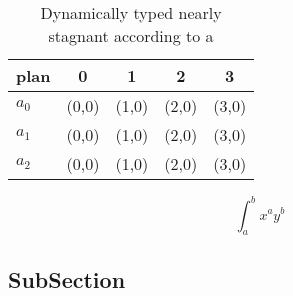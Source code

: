 \documentclass[a4paper]{article}
\begin{document}
\begin{table}
\begin{adjustbox}{width=0.5\columnwidth}
\begin{tabular}{|l|l|l|l|l|}
\hline
\textbf{plan} & \multicolumn{1}{c|}{\textbf{0}} & \multicolumn{1}{c|}{\textbf{1}} & \multicolumn{1}{c|}{\textbf{2}} & \multicolumn{1}{c|}{\textbf{3}} \\ \hline
\textbf{$a_0$}  & (0,0) & (1,0) & (2,0) & (3,0) \\ \hline
\textbf{$a_1$}  & (0,0) & (1,0) & (2,0) & (3,0) \\ \hline
\textbf{$a_2$}  & (0,0) & (1,0) & (2,0) & (3,0) \\ \hline
\end{tabular}
\end{adjustbox}
\caption{Dynamically typed nearly stagnant according to a 
}
\end{table}

\[ \int_{a}^{b}{x^{a}y^{b}} \]

\subsection{SubSection}
\end{document}
